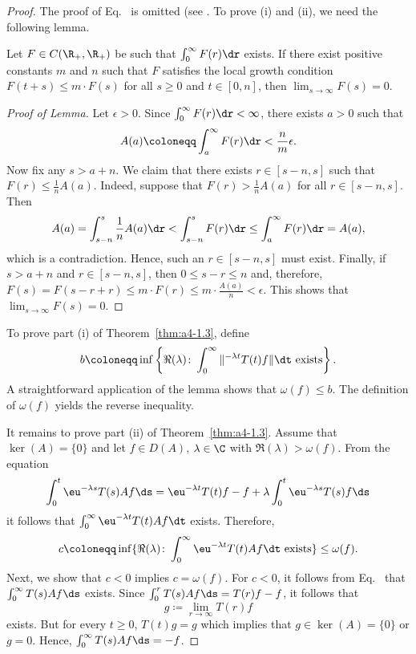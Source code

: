 \begin{proof}  The proof of Eq.~ is omitted (see \textcite[p.306]{hillephillips:1957}. 
To prove (i) and (ii), we need the following lemma.
\begin{lemma*}\label{lem:a4-1.3}
Let $F \in C(\R_{+},\R_{+})$ be such that $\int_{0}^{\infty} F(r) \dr$ exists. 
If there exist positive constants $m$ and $n$ such that $F$ satisfies the local growth condition $F(t + s) \leq m \cdot F(s)$ for all $s \geq 0$ and $t \in \left[0,n\right]$, then $\lim_{s \to \infty} F(s) = 0$.
\end{lemma*}
\begin{proof}[Proof of Lemma]
Let $\epsilon > 0$. Since $\int_0^\infty F(r) \dr < \infty$, there exists $a > 0$ such that
\[
A(a) \coloneqq \int_{a}^{\infty} F(r) \dr < \frac{n}{m}\epsilon.
\]
Now fix any $s > a + n$. We claim that there exists $r \in [s - n, s]$ such that
\(
F(r) \leq \frac{1}{n}A(a).
\)
Indeed, suppose that $F(r) > \frac{1}{n}A(a)$ for all $r \in [s - n, s]$. Then
\[ A(a) = \int_{s-n}^{s}\frac{1}{n}A(a)\dr < \int_{s-n}^{s}F(r)\dr \le \int_a^\infty F(r)\dr = A(a), \]
which is a contradiction.
Hence, such an $r \in [s - n, s]$ must exist.
Finally, if\/ $s>a+n$ and $r\in [s-n,s]$, then $0\le s-r\le n$ and, therefore, $F(s) = F(s-r+r) \leq m \cdot F(r) \leq m \cdot \frac{A(a)}{n} < \epsilon$. 
This shows that $\lim_{s \to \infty} F(s) = 0$.
\end{proof}
To prove part (i) of Theorem~\ref{thm:a4-1.3}, define 
%
\[
	b \coloneqq \inf \left\{\Re(\lambda)\colon\int_{0}^{\infty} \|^{-\lambda t} T(t)f\|  \dt \text{ exists} \right\}.
\]
%
A straightforward application of the lemma shows that $\omega(f) \leq b$.
The definition of\/ $\omega(f)$ yields the reverse inequality.

It remains to prove part (ii) of Theorem~\ref{thm:a4-1.3}.
Assume that $\ker(A) = \{0\}$ and let $f \in D(A)$, $\lambda \in \C$ with $\Re(\lambda) > \omega(f)$. 
From the equation
\[
\int_{0}^{t} \eu^{-\lambda s} T(s)Af  \ds = \eu^{-\lambda t}T(t)f - f + \lambda \int_{0}^{t} \eu^{-\lambda s} T(s)f  \ds
\]
it follows that $\int_{0}^{\infty} \eu^{-\lambda t} T(t)Af  \dt$ exists. 
Therefore, 
\[c \coloneqq \inf\{\Re(\lambda)\colon\int_{0}^{\infty} \eu^{-\lambda t}T(t)Af  \dt \text{ exists}\} \leq \omega(f).\]
Next, we show that $c < 0$ implies $c = \omega(f)$. 
For $c < 0$, it follows from Eq.~ that $\int_{0}^{\infty} T(s)Af  \ds$ exists. 
Since $\int_{0}^{r} T(s)Af  \ds = T(r)f - f$, it follows that \[g \coloneqq\lim_{r \to \infty} T(r)f\] exists. 
But for every $t \geq 0$, $T(t)g = g$ which implies that $g \in \ker(A) = \{0\}$ or $g = 0$. 
Hence, $\int_{0}^{\infty} T(s)Af  \ds = -f$.


\end{proof}
